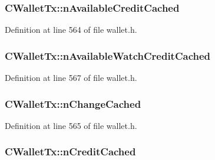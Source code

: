 \subsubsection[{n\+Available\+Credit\+Cached}]{ C\+Wallet\+Tx\+::n\+Available\+Credit\+Cached\hspace{0.3cm}{\ttfamily [mutable]}}\label{class_c_wallet_tx_a095729d9d744bb1a47d07952f8aa159e}


Definition at line 564 of file wallet.\+h.

\hypertarget{class_c_wallet_tx_ab3113c0543c6f68ccbb2449dde29aec7}{}
\subsubsection[{n\+Available\+Watch\+Credit\+Cached}]{ C\+Wallet\+Tx\+::n\+Available\+Watch\+Credit\+Cached\hspace{0.3cm}{\ttfamily [mutable]}}\label{class_c_wallet_tx_ab3113c0543c6f68ccbb2449dde29aec7}


Definition at line 567 of file wallet.\+h.

\hypertarget{class_c_wallet_tx_af324c0c303c44aea9c790e782187343e}{}
\subsubsection[{n\+Change\+Cached}]{ C\+Wallet\+Tx\+::n\+Change\+Cached\hspace{0.3cm}{\ttfamily [mutable]}}\label{class_c_wallet_tx_af324c0c303c44aea9c790e782187343e}


Definition at line 565 of file wallet.\+h.

\hypertarget{class_c_wallet_tx_a6f6b791fc148e3ce053e229f8fe83496}{}
\subsubsection[{n\+Credit\+Cached}]{ C\+Wallet\+Tx\+::n\+Credit\+Cached\hspace{0.3cm}{\ttfamily [mutable]}}\label{class_c_wallet_tx_a6f6b791fc148e3ce053e229f8fe83496}


